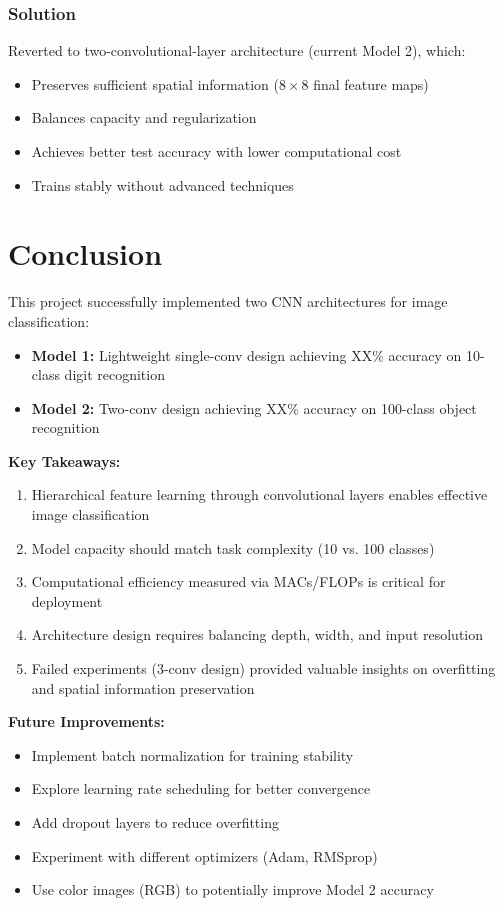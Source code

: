 \documentclass[11pt,a4paper]{article}
\begin{document}
\subsubsection{Solution}
Reverted to two-convolutional-layer architecture (current Model 2), which:
\begin{itemize}
    \item Preserves sufficient spatial information ($8 \times 8$ final feature maps)
    \item Balances capacity and regularization
    \item Achieves better test accuracy with lower computational cost
    \item Trains stably without advanced techniques
\end{itemize}

\section{Conclusion}

This project successfully implemented two CNN architectures for image classification:

\begin{itemize}
    \item \textbf{Model 1:} Lightweight single-conv design achieving XX\% accuracy on 10-class digit recognition
    \item \textbf{Model 2:} Two-conv design achieving XX\% accuracy on 100-class object recognition
\end{itemize}

\textbf{Key Takeaways:}
\begin{enumerate}
    \item Hierarchical feature learning through convolutional layers enables effective image classification
    \item Model capacity should match task complexity (10 vs. 100 classes)
    \item Computational efficiency measured via MACs/FLOPs is critical for deployment
    \item Architecture design requires balancing depth, width, and input resolution
    \item Failed experiments (3-conv design) provided valuable insights on overfitting and spatial information preservation
\end{enumerate}

\textbf{Future Improvements:}
\begin{itemize}
    \item Implement batch normalization for training stability
    \item Explore learning rate scheduling for better convergence
    \item Add dropout layers to reduce overfitting
    \item Experiment with different optimizers (Adam, RMSprop)
    \item Use color images (RGB) to potentially improve Model 2 accuracy
\end{itemize}
\end{document}
